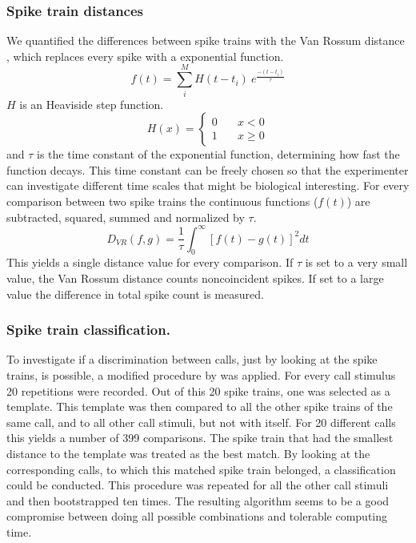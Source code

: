 \documentclass[12pt,a4paper,pdftex]{article}
\begin{document}
\subsubsection*{Spike train distances}
\label{spiketraindistances}
We quantified the  differences between spike trains with the Van Rossum distance \cite{rossum2001}, which replaces every spike with a exponential function.
\begin{equation}
\label{eq:VR}
f(t) =  \sum_{i}^{M} H(t-t_i)~e^{\frac{-(t-t_i)}{\tau}}
\end{equation}
$H$ is an Heaviside step function.
\begin{equation}
\label{eq:H}
H(x) = \left\{
\begin{array}{ll}
0 & \quad x < 0 \\
1 & \quad x \geq 0
\end{array}
\right.
\end{equation}
and $\tau$ is the time constant of the exponential function, determining how fast the function decays.
This time constant can be freely chosen so that the experimenter can investigate different time scales that might be biological interesting.
For every comparison between two spike trains the continuous functions ($f(t)$) are subtracted, squared, summed and normalized by $\tau$. 
\begin{equation}
\label{eq:VRD}
D_{VR}(f,g) = \frac{1}{\tau} \int_{0}^{\infty}[f(t)-g(t)]^2 dt
\end{equation}
This yields a single distance value for every comparison. If $\tau$ is set to a very small value, the Van Rossum distance counts noncoincident spikes. If set to a large value the difference in total spike count is measured.

\subsubsection*{Spike train classification.}
To investigate if a discrimination between calls, just by looking at the spike trains, is possible, a modified procedure by \cite{machens2003} was applied. For every call stimulus 20 repetitions were recorded. Out of this 20 spike trains, one was selected as a template. This template was then compared to all the other spike trains of the same call, and to all other call stimuli, but not with itself. For 20 different calls this yields a number of 399 comparisons. The spike train that had the smallest distance to the template was treated as the best match. By looking at the corresponding calls, to which this matched spike train belonged, a classification could be conducted. This procedure was repeated for all the other call stimuli and then bootstrapped ten times. The resulting algorithm seems to be a good compromise between doing all possible combinations and tolerable computing time.
\end{document}
